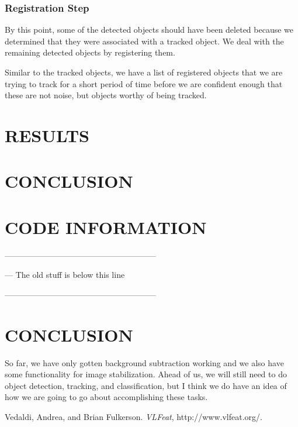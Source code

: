 \documentclass[a4paper, 10pt, conference]{ieeeconf}      %
\begin{document}
\subsubsection{Registration Step}

By this point, some of the detected objects should have been deleted because we determined that they were associated with a tracked object. We deal with the remaining detected objects by registering them. \newline

Similar to the tracked objects, we have a list of registered objects that we are trying to track for a short period of time before we are confident enough that these are not noise, but objects worthy of being tracked.


\section{RESULTS}


\section{CONCLUSION}


\section{CODE INFORMATION}



--------------------------------------------------------

--- The old stuff is below this line

--------------------------------------------------------





\section{CONCLUSION}
So far, we have only gotten background subtraction working and we also have some functionality for image stabilization. Ahead of us, we will still need to do object detection, tracking, and classification, but I think we do have an idea of how we are going to go about accomplishing these tasks. 













\begin{thebibliography}{99}

Vedaldi, Andrea, and Brian Fulkerson. {\it VLFeat}, http://www.vlfeat.org/.



\end{thebibliography}
\end{document}
